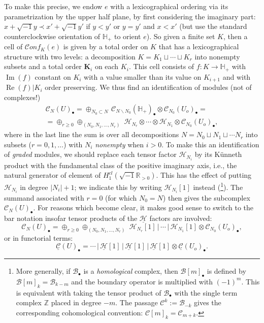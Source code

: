 \documentclass[12pt,letterpaper]{amsart}
\numberwithin{equation}{section}
\def\HH{{\mathbb H}}
\def\Kbold{{\mathbf K}}
\def\RR{{\mathbb R}}
\def\ZZ{{\mathbb Z}}
\def\ssm{\smallsetminus}
\def\Bcal{{\mathcal B}}
\def\Ccal{{\mathcal C}}
\def\Hcal{{\mathcal H}}
\def\uHcal{{\underline\Hcal}}
\def\Cscr{{\mathscr C}}
\def\pt{{\scriptscriptstyle\bullet}}
\newcommand\conf{\mathscr{C}\!\mathit{onf}\!}
\newcommand\im{\operatorname{Im}}
\newcommand\re{\operatorname{Re}}
\theoremstyle{remark}
\begin{document}
To make this precise,  we endow $e$ with a lexicographical ordering via its parametrization by the upper half plane, by first considering 
the imaginary part: $x+\sqrt{-1} y\prec x'+\sqrt{-1}y'$ if $y<y'$ or $y=y'$ and $x<x'$ (but use the standard counterclockwise orientation of $\HH_+$ to orient $e$).  So given a finite set $K$, then a cell of $\conf_K(e)$ is 
given by a total order on $K$ that  has a lexicographical structure with two levels:  a decomposition $K=K_1\sqcup\cdots \sqcup K_r$ into 
nonempty subsets and a total order $\Kbold_i$ 
on each $K_i$. This cell consists of $f: K\to \HH_+$ with $\im (f)$ constant on $K_i$ with a value smaller than its value on $K_{i+1}$ and 
with $\re(f)|K_i$ order preserving.  We thus find an identification  of modules (not of complexes!)
\begin{multline*}
\Cscr_N(U)_\pt=\oplus_{N_0\subset N}\, \Cscr_{N\ssm N_0}(\HH_+)_\pt\otimes \Cscr_{N_0}(U_o)_\pt=\\
=\oplus_{r\ge 0}\oplus_{(N_0, N_1, \dots ,N_r)}\; \Hcal_{N_r}\otimes\cdots\otimes  \Hcal_{N_1}\otimes\Cscr_{N_0}(U_o)_\pt,
\end{multline*}
where  in the last line the sum is over all decompositions $N=N_0\sqcup N_1\sqcup \cdots N_r$ into subsets ($r=0,1,\dots$) with $N_i$  \emph{nonempty} when $i>0$.  To make this an identification of \emph{graded} modules, we should replace each tensor factor $\Hcal_{N_i}$ by its K\"unneth product with the fundamental class of the positive imaginary axis, i.e., the natural generator of  element of $H^{cl}_1(\sqrt{-1}\RR_{>0})$. This has the effect of putting  $\Hcal_{N_i}$  in degree $|N_i|+1$; we indicate this by writing 
$\Hcal_{N_i}[1]$ instead (\footnote{More generally, if $\Bcal_\pt$ is a \emph{homological} complex, then $\Bcal[m]_\pt$ is 
defined by $\Bcal[m]_k=\Bcal_{k-m}$ and the boundary operator is multiplied with  $(-1)^m$.
This is equivalent with  taking the tensor product of $\Bcal_\pt$ with the single term complex $\ZZ$ placed in degree $-m$. The passage $\Ccal^k:=\Bcal_{-k}$ gives the corresponding cohomological  convention: $\Ccal[m]_k=\Ccal_{m+k}$.}). The summand  associated with  $r=0$ (for which  $N_0=N$) then gives  the subcomplex $\Cscr_N(U)_\pt$. For reasons which become clear, it makes good sense to switch to the bar notation insofar tensor products of the $\uHcal$ factors are involved:
\[
\Cscr_N(U)_\pt=\oplus_{r\ge 0}\oplus_{(N_0, N_1, \dots ,N_r)}\; \Hcal_{N_r}[1]\, \big|\, \cdots  \, \big|\, \Hcal_{N_1}[1]\otimes\Cscr_{N_0}(U_o)_\pt,
\]
or in  functorial terms:
\[
\underline{\Cscr} (U)_\pt=  \cdots \, \big|\, \uHcal [1]\, \big|\, \uHcal [1] \, \big|\, \uHcal [1]\otimes\underline{\Cscr}(U_o)_\pt.
\]
\end{document}
